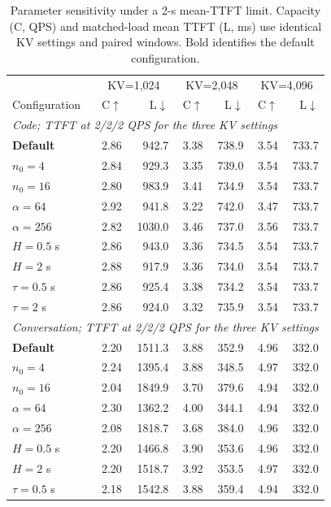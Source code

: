 \begin{table}[t]
\centering
\small
\caption{Parameter sensitivity under a 2-s mean-TTFT limit. Capacity (C, QPS) and matched-load mean TTFT (L, ms) use identical KV settings and paired windows. Bold identifies the default configuration.}
\label{tab:parameter-sensitivity-2s}
\begin{tabular}{lrrrrrr}
\toprule
& \multicolumn{2}{c}{KV=1,024} & \multicolumn{2}{c}{KV=2,048} & \multicolumn{2}{c}{KV=4,096} \\
Configuration & C$\uparrow$ & L$\downarrow$ & C$\uparrow$ & L$\downarrow$ & C$\uparrow$ & L$\downarrow$ \\
\midrule
\multicolumn{7}{l}{\textit{Code; TTFT at 2/2/2 QPS for the three KV settings}} \\
\textbf{Default} & 2.86 & 942.7 & 3.38 & 738.9 & 3.54 & 733.7 \\
$n_0=4$ & 2.84 & 929.3 & 3.35 & 739.0 & 3.54 & 733.7 \\
$n_0=16$ & 2.80 & 983.9 & 3.41 & 734.9 & 3.54 & 733.7 \\
$\alpha=64$ & 2.92 & 941.8 & 3.22 & 742.0 & 3.47 & 733.7 \\
$\alpha=256$ & 2.82 & 1030.0 & 3.46 & 737.0 & 3.56 & 733.7 \\
$H=0.5$ s & 2.86 & 943.0 & 3.36 & 734.5 & 3.54 & 733.7 \\
$H=2$ s & 2.88 & 917.9 & 3.36 & 734.0 & 3.54 & 733.7 \\
$\tau=0.5$ s & 2.86 & 925.4 & 3.38 & 734.2 & 3.54 & 733.7 \\
$\tau=2$ s & 2.86 & 924.0 & 3.32 & 735.9 & 3.54 & 733.7 \\
\midrule
\multicolumn{7}{l}{\textit{Conversation; TTFT at 2/2/2 QPS for the three KV settings}} \\
\textbf{Default} & 2.20 & 1511.3 & 3.88 & 352.9 & 4.96 & 332.0 \\
$n_0=4$ & 2.24 & 1395.4 & 3.88 & 348.5 & 4.97 & 332.0 \\
$n_0=16$ & 2.04 & 1849.9 & 3.70 & 379.6 & 4.94 & 332.0 \\
$\alpha=64$ & 2.30 & 1362.2 & 4.00 & 344.1 & 4.94 & 332.0 \\
$\alpha=256$ & 2.08 & 1818.7 & 3.68 & 384.0 & 4.96 & 332.0 \\
$H=0.5$ s & 2.20 & 1466.8 & 3.90 & 353.6 & 4.96 & 332.0 \\
$H=2$ s & 2.20 & 1518.7 & 3.92 & 353.5 & 4.97 & 332.0 \\
$\tau=0.5$ s & 2.18 & 1542.8 & 3.88 & 359.4 & 4.94 & 332.0 \\

\end{tabular}
\end{table}
